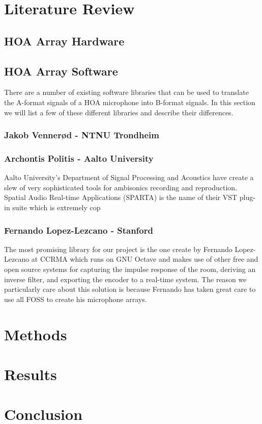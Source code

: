 \section{Literature Review}

\subsection{HOA Array Hardware}

\subsection{HOA Array Software}
There are a number of existing software libraries that can be used to translate the A-format signals of a HOA microphone into B-format signals. In this section we will list a few of these different libraries and describe their differences.

\subsubsection{Jakob Vennerød - NTNU Trondheim}

\subsubsection{Archontis Politis - Aalto University}
Aalto University's Department of Signal Processing and Acoustics have create a slew of very sophisticated tools for ambisonics recording and reproduction. Spatial Audio Real-time Applications (SPARTA) is the name of their VST plug-in suite which is extremely cop

\subsubsection{Fernando Lopez-Lezcano - Stanford}
The most promising library for our project is the one create by Fernando Lopez-Lezcano at CCRMA which runs on GNU Octave and makes use of other free and open source systems for capturing the impulse response of the room, deriving an inverse filter, and exporting the encoder to a real-time system. The reason we particularly care about this solution is because Fernando has taken great care to use all FOSS to create his microphone arrays. 


\section{Methods}

\section{Results}

\section{Conclusion}
